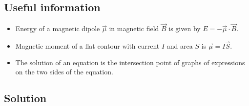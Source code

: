 \subsection*{Useful information}
\begin{itemize}
    \item Energy of a magnetic dipole $\vec{\mu}$ in magnetic field $\vec{B}$
        is given by $E = -\vec{\mu} \cdot \vec{B}$.

    \item Magnetic moment of a flat contour with current $I$ and area $S$ is
        $\vec{\mu} = I\vec{S}$.

    \item The solution of an equation is the intersection point of graphs
        of expressions on the two sides of the equation.
\end{itemize}

\subsection*{Solution}

